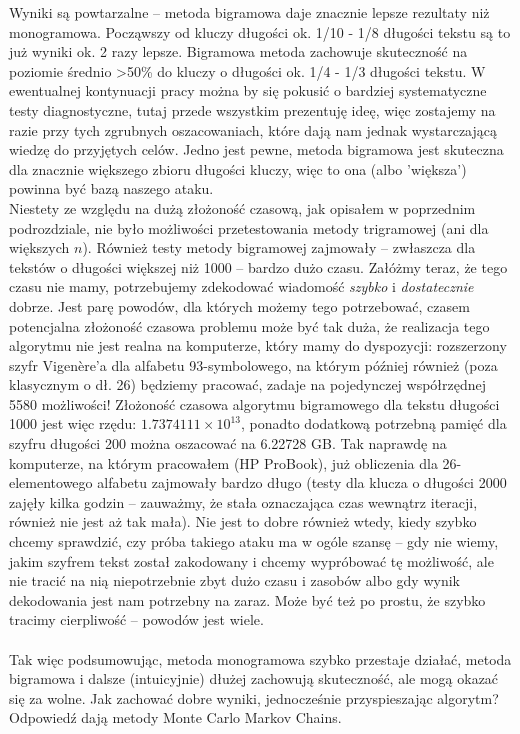 \documentclass[a4paper]{article}
\theoremstyle{defn}
\theoremstyle{theorem}
\theoremstyle{lemma}
\theoremstyle{cor}
\theoremstyle{fact}
\begin{document}
Wyniki są powtarzalne – metoda bigramowa daje znacznie lepsze rezultaty niż monogramowa. Począwszy od kluczy długości ok. 1/10 - 1/8 długości tekstu są to już wyniki ok. 2 razy lepsze. Bigramowa metoda zachowuje skuteczność na poziomie średnio >50\% do kluczy o długości ok. 1/4 - 1/3  długości tekstu. W ewentualnej kontynuacji pracy można by się pokusić o bardziej systematyczne testy diagnostyczne, tutaj przede wszystkim prezentuję ideę, więc zostajemy na razie przy tych zgrubnych oszacowaniach, które dają nam jednak wystarczającą wiedzę do przyjętych celów. Jedno jest pewne, metoda bigramowa jest skuteczna dla znacznie większego zbioru długości kluczy, więc to ona (albo 'większa') powinna być bazą naszego ataku.\\
Niestety ze względu na dużą złożoność czasową, jak opisałem w poprzednim podrozdziale, nie było możliwości przetestowania metody trigramowej (ani dla większych $n$). Również testy metody bigramowej zajmowały – zwłaszcza dla tekstów o długości większej niż 1000 – bardzo dużo czasu. Załóżmy teraz, że tego czasu nie mamy, potrzebujemy zdekodować wiadomość \textit{szybko} i \textit{dostatecznie} dobrze. Jest parę powodów, dla których możemy tego potrzebować, czasem potencjalna złożoność czasowa problemu może być tak duża, że realizacja tego algorytmu nie jest realna na komputerze, który mamy do dyspozycji: rozszerzony szyfr Vigenère'a dla alfabetu 93-symbolowego, na którym później również (poza klasycznym o dł. 26) będziemy pracować, zadaje na pojedynczej współrzędnej 5580 możliwości! Złożoność czasowa algorytmu bigramowego dla tekstu długości 1000 jest więc rzędu: $1.7374111 × 10^{13}$, ponadto dodatkową potrzebną pamięć dla szyfru długości 200 można oszacować na 6.22728 GB. Tak naprawdę na komputerze, na którym pracowałem (HP ProBook), już obliczenia dla 26-elementowego alfabetu zajmowały bardzo długo (testy dla klucza o długości 2000 zajęły kilka godzin – zauważmy, że stała oznaczająca czas wewnątrz iteracji, również nie jest aż tak mała). Nie jest to dobre również wtedy, kiedy szybko chcemy sprawdzić, czy próba takiego ataku ma w ogóle szansę – gdy nie wiemy, jakim szyfrem tekst został zakodowany i chcemy wypróbować tę możliwość, ale nie tracić na nią niepotrzebnie zbyt dużo czasu i zasobów albo gdy wynik dekodowania jest nam potrzebny na zaraz. Może być też po prostu, że szybko tracimy cierpliwość – powodów jest wiele.\\\\
Tak więc podsumowując, metoda monogramowa szybko przestaje działać, metoda bigramowa i dalsze (intuicyjnie) dłużej zachowują skuteczność, ale mogą okazać się za wolne. Jak zachować dobre wyniki, jednocześnie przyspieszając algorytm? Odpowiedź dają metody Monte Carlo Markov Chains.
\\
\end{document}
